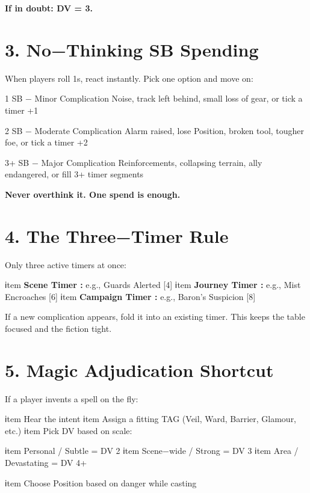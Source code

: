 \vspace{0.5em}
\textbf{If in doubt: DV = 3.}

\sectionrule

\section*{3. No−Thinking SB Spending}

When players roll 1s, react instantly. Pick one option and move on:

\begin{quickbox}{1 SB − Minor Complication}
Noise, track left behind, small loss of gear, or tick a timer +1
\end{quickbox}

\begin{quickbox}{2 SB − Moderate Complication}
Alarm raised, lose Position, broken tool, tougher foe, or tick a timer +2
\end{quickbox}

\begin{quickbox}{3+ SB − Major Complication}
Reinforcements, collapsing terrain, ally endangered, or fill 3+ timer segments
\end{quickbox}

\textbf{Never overthink it. One spend is enough.}

\sectionrule

\section*{4. The Three−Timer Rule}

Only three active timers at once:
\begin{itemize}
    ℹtem \textbf{Scene Timer :} e.g., Guards Alerted [4]
    ℹtem \textbf{Journey Timer :} e.g., Mist Encroaches [6]  
    ℹtem \textbf{Campaign Timer :} e.g., Baron's Suspicion [8]
\end{itemize}

If a new complication appears, fold it into an existing timer. This keeps the table focused and the fiction tight.

\sectionrule

\section*{5. Magic Adjudication Shortcut}

If a player invents a spell on the fly:
\begin{enumerate}
    ℹtem Hear the intent
    ℹtem Assign a fitting TAG (Veil, Ward, Barrier, Glamour, etc.)
    ℹtem Pick DV based on scale:
    \begin{itemize}
        ℹtem Personal / Subtle = DV 2
        ℹtem Scene−wide / Strong = DV 3  
        ℹtem Area / Devastating = DV 4+
    \end{itemize}
    ℹtem Choose Position based on danger while casting
\end{enumerate}

